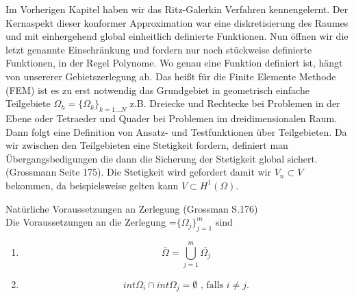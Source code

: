 Im Vorherigen Kapitel haben wir das Ritz-Galerkin Verfahren kennengelernt. Der Kernaspekt dieser konformer Approximation war eine diskretisierung des Raumes und mit einhergehend global einheitlich definierte Funktionen. Nun öffnen wir die letzt genannte Einschränkung und fordern nur noch stückweise definierte Funktionen, in der Regel Polynome. Wo genau eine Funktion definiert ist, hängt von unsererer Gebietszerlegung ab.
Das heißt für die Finite Elemente Methode (FEM) ist es zu erst notwendig das Grundgebiet in geometrisch einfache Teilgebiete $\Omega_h = \{\Omega_k \}_{k=1 \dots N}$ z.B. Dreiecke und Rechtecke bei Problemen in der Ebene oder Tetraeder und Quader bei Problemen im dreidimensionalen Raum.
Dann folgt eine Definition von Ansatz- und Testfunktionen über Teilgebieten. Da wir zwischen den Teilgebieten eine Stetigkeit fordern, definiert man Übergangsbedigungen die dann die Sicherung der Stetigkeit global sichert. (Grossmann Seite 175).
Die Stetigkeit wird gefordert damit wir $V_n \subset V$ bekommen, da beispielsweise gelten kann $V \subset H^1 (\Omega)$. 

\begin{Bemerkung} Natürliche Voraussetzungen an Zerlegung (Grossman S.176) \\
Die Voraussetzungen an die Zerlegung {}=$\{ \Omega_j \}_{j=1}^{m}$ sind 
\begin{enumerate}
\item \begin{equation*}
\bar{\Omega} = \bigcup\limits_{j=1}^{m} \bar{\Omega_j} 
\end{equation*}
\item \begin{equation*}
 int \Omega_i \cap int \Omega_j = \emptyset \text{ , falls } i \neq j.
\end{equation*}
\end{enumerate}
\end{Bemerkung}


